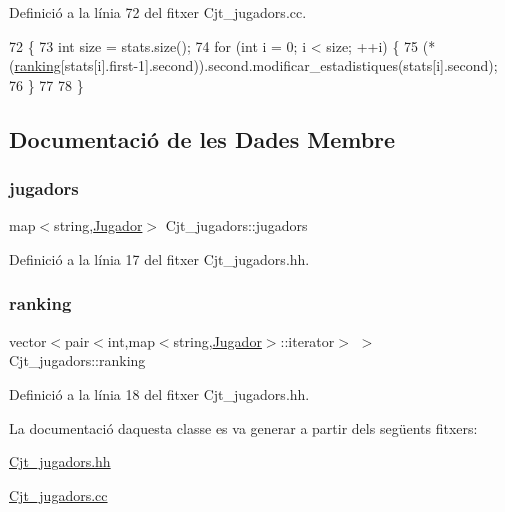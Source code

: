 Definició a la línia 72 del fitxer Cjt\+\_\+jugadors.\+cc.


\begin{DoxyCode}
72                                                                                    \{
73     \textcolor{keywordtype}{int} size = stats.size();
74     \textcolor{keywordflow}{for} (\textcolor{keywordtype}{int} i = 0; i < size; ++i) \{
75         (*(\mbox{\hyperlink{class_cjt__jugadors_af9f7e71820fb657bf489ce72a31e8034}{ranking}}[stats[i].first-1].second)).second.modificar\_estadistiques(stats[i].second);
76     \}
77     
78 \}
\end{DoxyCode}


\subsection{Documentació de les Dades Membre}
\mbox{\label{class_cjt__jugadors_a9a7fd899cca7f3c126120c8e7b4719d4}} 
\subsubsection{\texorpdfstring{jugadors}{jugadors}}
{\footnotesize\ttfamily map$<$string,\mbox{\hyperlink{class_jugador}{Jugador}}$>$ Cjt\+\_\+jugadors\+::jugadors\hspace{0.3cm}{\ttfamily [private]}}



Definició a la línia 17 del fitxer Cjt\+\_\+jugadors.\+hh.

\mbox{\label{class_cjt__jugadors_af9f7e71820fb657bf489ce72a31e8034}} 
\subsubsection{\texorpdfstring{ranking}{ranking}}
{\footnotesize\ttfamily vector$<$pair$<$int,map$<$string,\mbox{\hyperlink{class_jugador}{Jugador}}$>$\+::iterator$>$ $>$ Cjt\+\_\+jugadors\+::ranking\hspace{0.3cm}{\ttfamily [private]}}



Definició a la línia 18 del fitxer Cjt\+\_\+jugadors.\+hh.



La documentació d\textquotesingle{}aquesta classe es va generar a partir dels següents fitxers\+:\begin{DoxyCompactItemize}
\item 
\mbox{\hyperlink{_cjt__jugadors_8hh}{Cjt\+\_\+jugadors.\+hh}}\item 
\mbox{\hyperlink{_cjt__jugadors_8cc}{Cjt\+\_\+jugadors.\+cc}}\end{DoxyCompactItemize}
